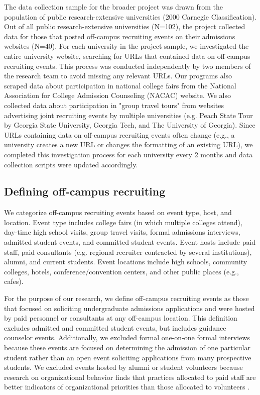 \documentclass[twoside]{article}
\begin{document}
The data collection sample for the broader project was drawn from the population of public research-extensive universities (2000 Carnegie Classification). Out of all public research-extensive universities (N=102), the project collected data for those that posted off-campus recruiting events on their admissions websites (N=40). For each university in the project sample, we investigated the entire university website, searching for URLs that contained data on off-campus recruiting events. This process was conducted independently by two members of the research team to avoid missing any relevant URLs. Our programs also scraped data about participation in national college fairs from the National Association for College Admission Counseling (NACAC) website. We also collected data about participation in "group travel tours" from websites advertising joint recruiting events by multiple universities (e.g. Peach State Tour by Georgia State University, Georgia Tech, and The University of Georgia). Since URLs containing data on off-campus recruiting events often change (e.g., a university creates a new URL or changes the formatting of an existing URL),  we completed this investigation process for each university every 2 months and data collection scripts were updated accordingly.

\subsection*{Defining off-campus recruiting}

We categorize off-campus recruiting events based on event type, host, and location. Event type includes college fairs (in which multiple colleges attend), day-time high school visits, group travel visits, formal admissions interviews, admitted student events, and committed student events. Event hosts include paid staff, paid consultants (e.g. regional recruiter contracted by several institutions), alumni, and current students. Event locations include high schools, community colleges, hotels, conference/convention centers, and other public places (e.g., cafes).  

For the purpose of our research, we define off-campus recruiting events as those that focused on soliciting undergraduate admissions applications and were hosted by paid personnel or consultants at any off-campus location. This definition excludes admitted and committed student events, but includes guidance counselor events. Additionally, we excluded formal one-on-one formal interviews because these events are focused on determining the admission of one particular student rather than an open event soliciting applications from many prospective students. We excluded events hosted by alumni or student volunteers because research on organizational behavior finds that practices allocated to paid staff are better indicators of organizational priorities than those allocated to volunteers \citep{RN531}. 
\end{document}
